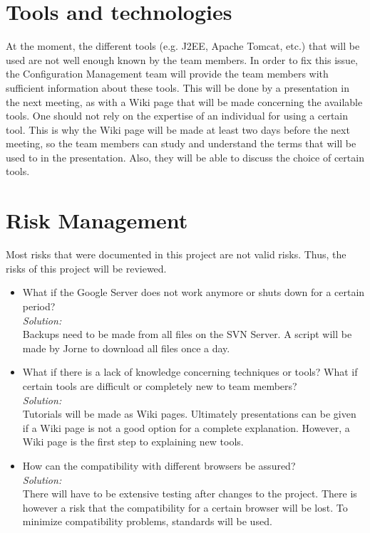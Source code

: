 \documentclass[a4paper, 12pt]{article}
\begin{document}
	\section{Tools and technologies}
At the moment, the different tools (e.g. J2EE, Apache Tomcat, etc.) that will be used are not well enough known by the team members. In order to fix this issue, the Configuration Management team will provide the team members with sufficient information about these tools. This will be done by a presentation in the next meeting, as with a Wiki page that will be made concerning the available tools. One should not rely on the expertise of an individual for using a certain tool. This is why the Wiki page will be made at least two days before the next meeting, so the team members can study and understand the terms that will be used to in the presentation. Also, they will be able to discuss the choice of certain tools.

	\section{Risk Management}
Most risks that were documented in this project are not valid risks. Thus, the risks of this project will be reviewed.
		\begin{itemize}
			\item What if the Google Server does not work anymore or shuts down for a certain period? \\
\textit{Solution:} \\
Backups need to be made from all files on the SVN Server. A script will be made by Jorne to download all files once a day.
			\item What if there is a lack of knowledge concerning techniques or tools? What if certain tools are difficult or completely new to team members?\\
\textit{Solution:} \\
Tutorials will be made as Wiki pages. Ultimately presentations can be given if a Wiki page is not a good option for a complete explanation. However, a Wiki page is the first step to explaining new tools.

			\item How can the compatibility with different browsers be assured? \\
\textit{Solution:} \\
There will have to be extensive testing after changes to the project. There is however a risk that the compatibility for a certain browser will be lost. To minimize compatibility problems, standards will be used.

		\end{itemize}
\end{document}
